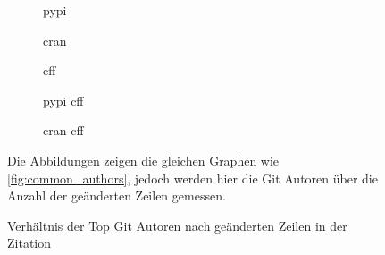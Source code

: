 \begin{figure}
    \begin{subfigure}{.5\textwidth}
        \centering
        
        \caption{\gls{pypi}}
        \label{fig:common_authors_by_files_pypi}
    \end{subfigure}%
    \begin{subfigure}{.5\textwidth}
        \centering
        
        \caption{\gls{cran}}
        \label{fig:common_authors_by_files_cran}
    \end{subfigure}
    \begin{subfigure}{.5\textwidth}
        \centering
        
        \caption{\gls{cff}}
        \label{fig:common_authors_by_files_cff}
    \end{subfigure}%
    \begin{subfigure}{.5\textwidth}
        \centering
        
        \caption{\gls{pypi} \gls{cff}}
        \label{fig:common_authors_by_files_pypi_cff}
    \end{subfigure}
    \centering
    \begin{subfigure}{.5\textwidth}
        \centering
        
        \caption{\gls{cran} \gls{cff}}
        \label{fig:common_authors_by_files_cran_cff}
    \end{subfigure}
    \caption{Verhältnis der Top Git Autoren nach geänderten Zeilen in der Zitation}
    \label{fig:common_authors_by_files}
    \small
    Die Abbildungen zeigen die gleichen Graphen wie \autoref{fig:common_authors}, jedoch werden hier die Git Autoren über die Anzahl der geänderten Zeilen gemessen.
\end{figure}

